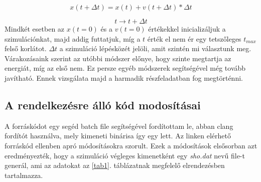 \begin{multicols}{2}
\begin{equation}
    x \left(t + \Delta t \right) = x \left( t \right) + v \left( t + \Delta t \right) * \Delta t
\end{equation}

\begin{equation}
    t \to t + \Delta t
\end{equation}
Mindkét esetben az $x \left( t = 0 \right)$ és a $v \left( t = 0 \right)$ értékekkel inicializáljuk a szimulációnkat, majd addig futtatjuk, míg a $t$ érték el nem ér egy tetszőleges $t_{max}$ felső korlátot. $\Delta t$ a szimuláció lépésközét jelöli, amit szintén mi választunk meg. \\
Várakozásaink szerint az utóbbi módszer előnye, hogy szinte megtartja az energiát, míg az első nem\cite{cromer}. Ez persze egyéb módszerek segítségével még tovább javítható\cite{Iserles-2003}. Ennek vizsgálata majd a harmadik részfeladatban fog megtörténni.

\subsection{A rendelkezésre álló kód modosításai}
A forráskódot egy segéd batch file segítségével fordítottam le, abban clang fordítót használva, mely kimeneti binárisa így egy  lett. Az \cite{szamszin} linken elérhető forráskód ellenben apró módosításokra szorult. Ezek a módosítások elsősorban azt eredményezték, hogy a szimuláció végleges kimenetként egy \emph{sho.dat} nevű file-t generál, ami az adatokat az \ref{tab1}. táblázatnak megfelelő elrendezésben tartalmazza.


\end{multicols}
